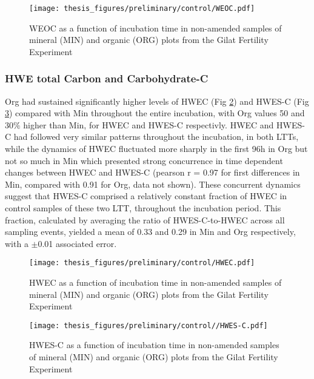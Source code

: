 \documentclass[12pt]{report}
\begin{document}
		\begin{figure}[H]
			\centering
			\texttt{[image: thesis\_figures/preliminary/control/WEOC.pdf]}
			\caption{WEOC  as a function of incubation time in non-amended samples  of mineral (MIN) and organic (ORG) plots from the Gilat Fertility Experiment}
			\label{fig:weoc_control_preliminary}
		\end{figure}
		
		
		\subsubsection{HWE total Carbon and Carbohydrate-C}
		
		Org had sustained significantly higher levels of HWEC (Fig \ref{fig:hwec_control_preliminary}) and HWES-C (Fig \ref{fig:hwes-c_control_preliminary}) compared with Min throughout the entire incubation, with Org values 50 and 30$\%$ higher than Min, for HWEC and HWES-C respectivly. HWEC and HWES-C had followed very similar patterns throughout the incubation, in both LTTs, while the dynamics of HWEC fluctuated more sharply in the first 96h in Org but not so much in Min which presented strong concurrence in time dependent changes between HWEC and HWES-C (pearson r = 0.97 for first differences in Min, compared with 0.91 for Org, data not shown). These concurrent dynamics suggest that HWES-C comprised a relatively constant fraction of HWEC in control samples of these two LTT, throughout the incubation period. This fraction, calculated by averaging the ratio of HWES-C-to-HWEC across all sampling events, yielded a mean of 0.33 and 0.29 in Min and Org respectively, with a $\pm$0.01 associated error.
		
		\begin{figure}[H]
			\centering
			\texttt{[image: thesis\_figures/preliminary/control/HWEC.pdf]}
			\caption{HWEC as a function of incubation time in non-amended samples  of mineral (MIN) and organic (ORG) plots from the Gilat Fertility Experiment}
			\label{fig:hwec_control_preliminary}
		\end{figure}
		
		\begin{figure}[H]
			\centering
			\texttt{[image: thesis\_figures/preliminary/control//HWES-C.pdf]}
			\caption{HWES-C  as a function of incubation time in non-amended samples  of mineral (MIN) and organic (ORG) plots from the Gilat Fertility Experiment}
			\label{fig:hwes-c_control_preliminary}
		\end{figure}
		
\end{document}

